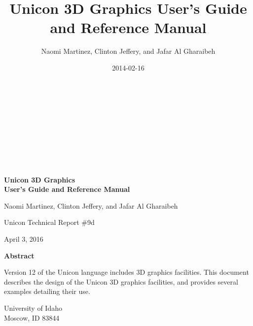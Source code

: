 \documentclass[letterpaper]{article}
\title{Unicon 3D Graphics User's Guide and Reference Manual}
\author{Naomi Martinez, Clinton Jeffery, and Jafar Al Gharaibeh}
\date{2014-02-16}
\begin{document}
\clearpage\setcounter{page}{1}\pagestyle{Nextconverti}
\thispagestyle{Standard}

\ \\
\ \\
\ \\
\ \\
\ \\
\ \\
\ \\

\begin{center}
{\Large\bfseries
Unicon 3D Graphics\\
User's Guide and Reference Manual
}
\end{center}

\bigskip

\bigskip

\bigskip

\bigskip

\bigskip

\bigskip

\bigskip


{\centering{}
Naomi Martinez, Clinton Jeffery, and Jafar Al Gharaibeh
\par}

{\centering{}
Unicon Technical Report \#9d
\par}

{\centering{}
April 3, 2016
\par}

\bigskip

\bigskip

\bigskip

\bigskip

\bigskip

{\centering{}\bfseries
Abstract
\par}


\bigskip

{
Version 12 of the Unicon language includes 3D graphics facilities.
This document describes the design of the Unicon 3D
graphics facilities, and provides several examples detailing their use.}


\bigskip


\bigskip


\bigskip


\bigskip


\bigskip

{\centering{}
University of Idaho\\
Moscow, ID 83844
\par}
\end{document}
